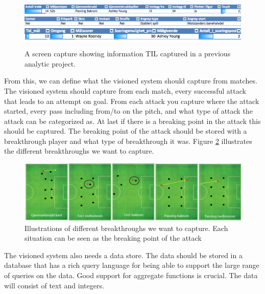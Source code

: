\begin{figure}[ht!]
\centering
\includegraphics[width=1\textwidth]{images/requirement/prev_domain_model1}
\includegraphics[width=1\textwidth]{images/requirement/prev_domain_model2}
\includegraphics[width=1\textwidth]{images/requirement/prev_domain_model3}
\caption{A screen capture showing information \ac{TIL} captured in a previous analytic project.}
\label{fig:prevdomainmodel}
\end{figure}

From this, we can define what the visioned system should capture from matches. The visioned system should capture from each match, every successful attack that leads to an attempt on goal. From each attack you capture where the attack started, every pass including from/to on the pitch, and what type of attack the attack can be categorized as. At last if there is a breaking point in the attack this should be captured. The breaking point of the attack should be stored with a breakthrough player and what type of breakthrough it was. Figure \ref{fig:different_break} illustrates the different breakthroughs we want to capture.

\begin{figure}[ht!]
\centering
\includegraphics[width=1\textwidth]{images/general/different_breakthroughs.png}
\caption{Illustrations of different breakthroughs we want to capture. Each situation can be seen as the breaking point of the attack}
\label{fig:different_break}
\end{figure}

The visioned system also needs a data store. The data should be stored in a database that has a rich query language for being able to support the large range of queries on the data. Good support for aggregate functions is crucial. The data will consist of text and integers.

